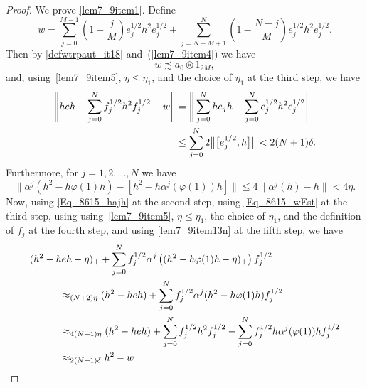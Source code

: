 \documentclass[11pt]{amsart}
\theoremstyle{plain}
\theoremstyle{definition}
\theoremstyle{remark}
\numberwithin{equation}{section}
\newcommand{\af}{\alpha}
\newcommand{\dt}{\delta}
\newcommand{\et}{\eta}
\newcommand{\ph}{\varphi}
\begin{document}
\begin{proof}
We prove \ref{lem7_9item1}.
Define
\[
w = \sum_{j = 0}^{M - 1}
       \left( 1 - \frac{j}{M} \right) e_{j}^{1/2} h^2 e_{j}^{1/2}
    + \sum_{j = N - M + 1}^{N}
       \left( 1 - \frac{N - j}{M} \right) e_{j}^{1/2} h^2 e_{j}^{1/2}.
\]
Then by \eqref{defwtrpaut_it18} and~(\ref{lem7_9item4}) we have
%
\begin{equation}\label{Eq_8615_wPrec}
w \precsim a_{0} \otimes 1_{2 M},
\end{equation}
%
and, using~\eqref{lem7_9item5}, $\et \leq \et_1$,
and the choice of $\et_1$ at the third step, we have
%
\begin{align}\label{Eq_8615_wEst}
\Bigg\| h e h
  - \sum_{j = 0}^{N} f_{j}^{1/2} h^{2} f_{j}^{1/2} - w \Bigg\|
& = \Bigg\| \sum_{j = 0}^{N} h e_j h
  - \sum_{j = 0}^{N} e_{j}^{1/2} h^{2} e_{j}^{1/2} \Bigg\|
\\
& \leq \sum_{j = 0}^{N} 2 \big\| \big[ e_{j}^{1/2}, h \big] \big\|
  < 2 (N + 1) \dt.
\notag
\end{align}
%
Furthermore,
for $j = 1, 2, \ldots, N$ we have
%
\begin{equation}\label{Eq_8615_hajh}
\big\| \af^j (h^2 - h \ph (1) h)
     - [ h^2 - h \af^j (\ph (1)) h ] \big\|
 \leq 4 \| \af^j (h) - h \|
 < 4 \et.
\end{equation}
%
Now,
using \eqref{Eq_8615_hajh} at the second step,
using \eqref{Eq_8615_wEst} at the third step,
using using~\eqref{lem7_9item5}, $\et \leq \et_1$,
the choice of $\et_1$,
and the definition of $f_{j}$ at the fourth step,
and using \eqref{lem7_9item13n} at the fifth step,
we have
%
\begin{align*}
& (h^{2} - h e h - \eta)_{+}
 + \sum_{j = 0}^{N} f_{j}^{1/2} \alpha^{j} \left((h^{2}
 - h \varphi (1) h - \eta)_{+} \right) f_{j}^{1/2}
\\
& \hspace*{3em} {\mbox{}}
\approx_{(N + 2) \eta}
(h^{2} - h e h)+ \sum_{j = 0}^{N} f_{j}^{1/2} \alpha^{j} (h^{2}
 - h \varphi (1) h) f_{j}^{1/2}
\\
& \hspace*{3em} {\mbox{}}
\approx_{4 (N + 1) \eta}
(h^{2} - h e h) + \sum_{j = 0}^{N} f_{j}^{1/2} h^{2} f_{j}^{1/2}
   - \sum_{j = 0}^{N}
            f_{j}^{1/2} h \alpha^{j} (\varphi (1)) h f_{j}^{1/2}
\\
& \hspace*{3em} {\mbox{}}
\approx_{2 (N + 1) \delta}
h^{2} - w

\end{align*}
\end{proof}
\end{document}
